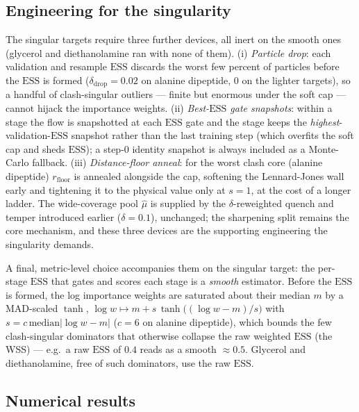 \documentclass[11pt]{article}
\providecommand{\ESS}{\mathrm{ESS}}
\begin{document}
\subsection{Engineering for the singularity}
\label{sec: mol-engineering}

The singular targets require three further devices, all inert on the smooth ones (glycerol and diethanolamine
ran with none of them). (i) \emph{Particle drop}: each validation and resample $\ESS$ discards the worst few
percent of particles before the $\ESS$ is formed ($\delta_{\mathrm{drop}} = 0.02$ on alanine dipeptide, $0$ on
the lighter targets), so a handful of clash-singular outliers --- finite but
enormous under the soft cap --- cannot hijack the importance weights. (ii) \emph{Best-$\ESS$ gate snapshots}:
within a stage the flow is snapshotted at each $\ESS$ gate and the stage keeps the
\emph{highest}-validation-$\ESS$ snapshot rather than the last training step (which overfits the soft cap and
sheds $\ESS$); a step-$0$ identity snapshot is always included as a Monte-Carlo fallback. (iii)
\emph{Distance-floor anneal}: for the worst clash core (alanine dipeptide) $r_{\mathrm{floor}}$ is annealed
alongside the cap, softening the Lennard-Jones wall early and tightening it to the physical value only at
$s = 1$, at the cost of a longer ladder. The wide-coverage pool $\hat\mu$ is supplied by the
$\delta$-reweighted quench and temper introduced earlier ($\delta = 0.1$), unchanged; the sharpening split
remains the core mechanism, and these three devices are the supporting engineering the singularity demands.

A final, metric-level choice accompanies them on the singular target: the per-stage $\ESS$ that gates and
scores each stage is a \emph{smooth} estimator. Before the $\ESS$ is formed, the log importance weights are
saturated about their median $m$ by a MAD-scaled $\tanh$,
$\log w \mapsto m + s\,\tanh\!\big((\log w - m)/s\big)$ with $s = c\,\mathrm{median}|\log w - m|$ ($c = 6$ on
alanine dipeptide), which bounds the few clash-singular dominators that otherwise collapse the raw weighted
$\ESS$ (the WSS) --- e.g.\ a raw $\ESS$ of $0.4$ reads as a smooth ${\approx}0.5$. Glycerol and
diethanolamine, free of such dominators, use the raw $\ESS$.

\subsection{Numerical results}
\label{sec: mol-results}
\end{document}
